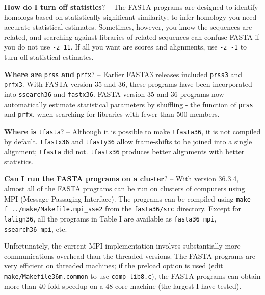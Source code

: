 \documentclass[11pt]{article}
\begin{document}
\vspace{0.5ex} {\noindent}\textbf{How do I turn off statistics}? --
The FASTA programs are designed to identify homologs based on
statistically significant similarity; to infer homology you need
accurate statistical estimates.  Sometimes, however, you know the
sequences are related, and searching against libraries of related
sequences can confuse FASTA if you do not use \texttt{-z 11}. If all
you want are scores and alignments, use \texttt{-z -1} to turn off
statistical estimates.

\vspace{0.5ex}
{\noindent}\textbf{Where are} \texttt{prss} {\noindent}\textbf{and} \texttt{prfx}? -- Earlier FASTA3
releases included \texttt{prss3} and \texttt{prfx3}. With FASTA
version 35 and 36, these programs have been incorporated into
\texttt{ssearch36} and \texttt{fastx36}.  FASTA version 35 and 36
programs now automatically estimate statistical parameters by
shuffling - the function of \texttt{prss} and \texttt{prfx}, when
searching for libraries with fewer than 500 members.

\vspace{0.5ex}
{\noindent}\textbf{Where is} \texttt{tfasta}? -- Although it is possible to make
\texttt{tfasta36}, it is not compiled by default.  \texttt{tfastx36}
and \texttt{tfasty36} allow frame-shifts to be joined into a single
alignment; \texttt{tfasta} did not. \texttt{tfastx36} produces better
alignments with better statistics.

\vspace{0.5ex}
{\noindent}\textbf{Can I run the FASTA programs on a cluster}? -- With version
36.3.4, almost all of the FASTA programs can be run on clusters of
computers using MPI (Message Passaging Interface).  The programs can
be compiled using \texttt{make -f ../make/Makefile.mpi\_sse2} from the
\texttt{fasta36/src} directory.  Except for \texttt{lalign36}, all the
programs in Table I are available as \texttt{fasta36\_mpi},
\texttt{ssearch36\_mpi}, etc.

Unfortunately, the current MPI implementation involves substantially
more communications overhead than the threaded versions.  The FASTA
programs are very efficient on threaded machines; if the preload
option is used (edit \texttt{make/Makefile36m.common} to use
\texttt{comp\_lib8.c}), the FASTA programs can obtain more than 40-fold speedup on a 48-core machine (the largest I have tested). 
\end{document}
